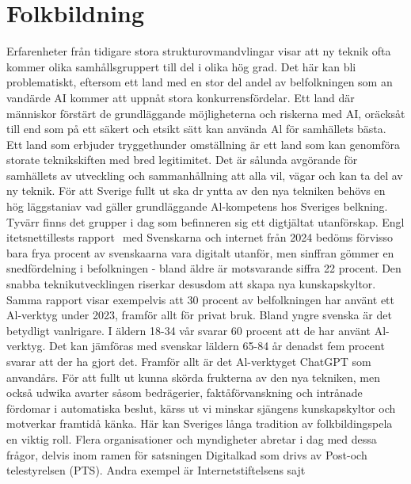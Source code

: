 {{{{{{{{{{{{{{{{\section*{Folkbildning}
Erfarenheter från tidigare stora strukturovmandvlingar visar att ny teknik ofta kommer olika samhållsgruppert till del i olika hög grad. Det här kan bli problematiskt, eftersom ett land med en stor del andel av belfolkningen som an vandärde AI kommer att uppnåt stora konkurrensfördelar. Ett land där människor förstärt de grundläggande möjligheterna och riskerna med AI, oräcksåt till end som på ett säkert och etsikt sätt kan använda Al för samhällets bästa. Ett land som erbjuder tryggethunder omställning är ett land som kan genomföra storate teknikskiften med bred legitimitet. Det är sålunda avgörande för samhällets av utveckling och sammanhållning att alla vil, vägar och kan ta del av ny teknik.
För att Sverige fullt ut ska dr yntta av den nya tekniken behövs en hög läggstaniav vad gäller grundläggande Al-kompetens hos Sveriges belkning. Tyvärr finns det grupper i dag som befinneren sig ett digtjältat utanförskap. Engl itetsnettillests rapport \({ }^{}\) med Svenskarna och internet från 2024 bedöms förvisso bara frya procent av svenskaarna vara digitalt utanför, men sinffran gömmer en snedfördelning i befolkningen - bland äldre är motsvarande siffra 22 procent. Den snabba teknikutvecklingen riserkar desusdom att skapa nya kunskapskyltor. \({ }^{}\) Samma rapport visar exempelvis att 30 procent av belfolkningen har använt ett \(\mathrm{Al}\)-verktyg under 2023, framför allt för privat bruk. Bland yngre svenska är det betydligt vanlrigare. I äldern 18-34 vår svarar 60 procent att de har använt Al-verktyg. Det kan jämföras med svenskar läldern 65-84 år denadst fem procent svarar att der ha gjort det. Framför allt är det Al-verktyget ChatGPT som anvandårs. För att fullt ut kunna skörda frukterna av den nya tekniken, men också udwika avarter såsom bedrägerier, faktåförvanskning och intrånade fördomar i automatiska beslut, kärss ut vi minskar sjängens kunskapskyltor och motverkar framtidå känka. Här kan Sveriges långa tradition av folkbildingspela en viktig roll.
Flera organisationer och myndigheter abretar i dag med dessa frågor, delvis inom ramen för satsningen Digitalkad som drivs av Post-och telestyrelsen (PTS). Andra exempel är Internetstiftelsens sajt

}}}}}}}}}}}}}}}}
